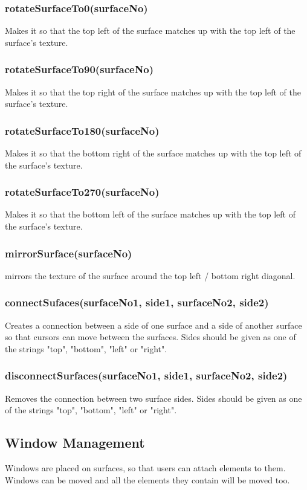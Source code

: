 \documentclass{acm_proc_article-sp}
\begin{document}
\subsubsection{rotateSurfaceTo0(surfaceNo)}
Makes it so that the top left of the surface matches up with the top left of the surface's texture.
\subsubsection{rotateSurfaceTo90(surfaceNo)}
Makes it so that the top right of the surface matches up with the top left of the surface's texture.
\subsubsection{rotateSurfaceTo180(surfaceNo)}
Makes it so that the bottom right of the surface matches up with the top left of the surface's texture.
\subsubsection{rotateSurfaceTo270(surfaceNo)}
Makes it so that the bottom left of the surface matches up with the top left of the surface's texture.
\subsubsection{mirrorSurface(surfaceNo)}
mirrors the texture of the surface around the top left / bottom right diagonal.
\subsubsection{connectSufaces(surfaceNo1, side1, surfaceNo2, side2)}
Creates a connection between a side of one surface and a side of another surface so that cursors can move between the surfaces. Sides should be given as one of the strings "top", "bottom", "left" or "right".
\subsubsection{disconnectSurfaces(surfaceNo1, side1, surfaceNo2, side2)}
Removes the connection between two surface sides. Sides should be given as one of the strings "top", "bottom", "left" or "right".

\subsection{Window Management}
Windows are placed on surfaces, so that users can attach elements to them. Windows can be moved and all the elements they contain will be moved too.
\end{document}
